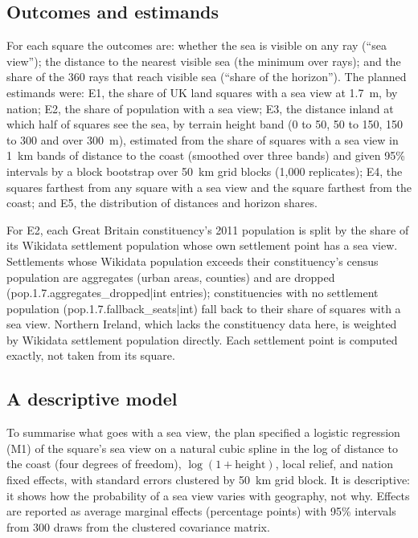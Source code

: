 \subsection{Outcomes and estimands}
For each square the outcomes are: whether the sea is visible on any ray (``sea view''); the distance to the nearest visible sea (the minimum over rays); and the share of the 360 rays that reach visible sea (``share of the horizon''). The planned estimands were: E1, the share of UK land squares with a sea view at 1.7~m, by nation; E2, the share of population with a sea view; E3, the distance inland at which half of squares see the sea, by terrain height band (0 to 50, 50 to 150, 150 to 300 and over 300~m), estimated from the share of squares with a sea view in 1~km bands of distance to the coast (smoothed over three bands) and given 95\% intervals by a block bootstrap over 50~km grid blocks (1,000 replicates); E4, the squares farthest from any square with a sea view and the square farthest from the coast; and E5, the distribution of distances and horizon shares.

For E2, each Great Britain constituency's 2011 population is split by the share of its Wikidata settlement population whose own settlement point has a sea view. Settlements whose Wikidata population exceeds their constituency's census population are aggregates (urban areas, counties) and are dropped ({{pop.1.7.aggregates_dropped|int}} entries); constituencies with no settlement population ({{pop.1.7.fallback_seats|int}}) fall back to their share of squares with a sea view. Northern Ireland, which lacks the constituency data here, is weighted by Wikidata settlement population directly. Each settlement point is computed exactly, not taken from its square.

\subsection{A descriptive model}
To summarise what goes with a sea view, the plan specified a logistic regression (M1) of the square's sea view on a natural cubic spline in the log of distance to the coast (four degrees of freedom), $\log(1+\text{height})$, local relief, and nation fixed effects, with standard errors clustered by 50~km grid block. It is descriptive: it shows how the probability of a sea view varies with geography, not why. Effects are reported as average marginal effects (percentage points) with 95\% intervals from 300 draws from the clustered covariance matrix.

